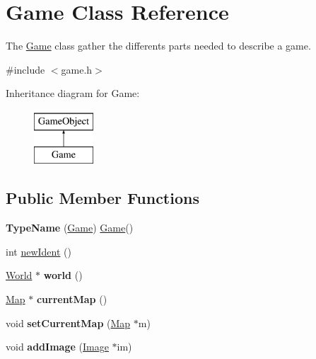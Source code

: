 \hypertarget{class_game}{\section{\-Game \-Class \-Reference}
\label{class_game}
}


\-The \hyperlink{class_game}{\-Game} class gather the differents parts needed to describe a game.  




{\ttfamily \#include $<$game.\-h$>$}

\-Inheritance diagram for \-Game\-:\begin{figure}[H]
\begin{center}
\leavevmode
\includegraphics[height=2.000000cm]{class_game}
\end{center}
\end{figure}
\subsection*{\-Public \-Member \-Functions}
\begin{DoxyCompactItemize}
\item 
\hypertarget{class_game_a8df2d5e5d28872b8a1d275d1ca92be4a}{{\bfseries \-Type\-Name} (\hyperlink{class_game}{\-Game}) \hyperlink{class_game}{\-Game}()}\label{class_game_a8df2d5e5d28872b8a1d275d1ca92be4a}

\item 
int \hyperlink{class_game_aeed0ba100700fb2f5d701fcf14d8871e}{new\-Ident} ()
\item 
\hypertarget{class_game_a38feaf6c233d25c2ad353bab65559790}{\hyperlink{class_world}{\-World} $\ast$ {\bfseries world} ()}\label{class_game_a38feaf6c233d25c2ad353bab65559790}

\item 
\hypertarget{class_game_a3b242dcb7703b409692ce0c91e799a8c}{\hyperlink{class_map}{\-Map} $\ast$ {\bfseries current\-Map} ()}\label{class_game_a3b242dcb7703b409692ce0c91e799a8c}

\item 
\hypertarget{class_game_af7394ea8ff98b0b819125a6bac47db2b}{void {\bfseries set\-Current\-Map} (\hyperlink{class_map}{\-Map} $\ast$m)}\label{class_game_af7394ea8ff98b0b819125a6bac47db2b}

\item 
\hypertarget{class_game_a8c246c639e16c351b7f261dc44a0897d}{void {\bfseries add\-Image} (\hyperlink{class_image}{\-Image} $\ast$im)}\label{class_game_a8c246c639e16c351b7f261dc44a0897d}

\end{DoxyCompactItemize}


